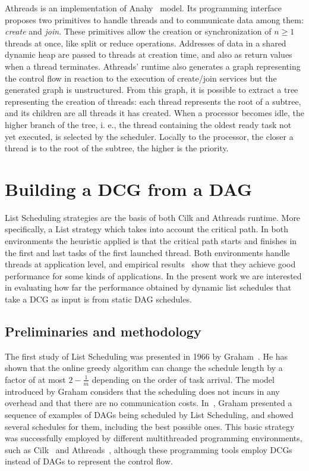 \documentclass[twocolumn]{svjour3}
\begin{document}
Athreads is an implementation of Anahy~\cite{VecParLNCS} model. Its programming interface proposes two primitives to handle threads and to communicate data among them: {\em create} and {\em join}. These primitives allow the creation or synchronization of $n \geq 1$ threads at once, like split or reduce operations. %
Addresses of data in a shared dynamic heap are passed to threads at creation time, and also as return values when a thread terminates. Athreads' runtime also generates a graph representing the control flow in reaction to the execution of create/join services but the generated graph is unstructured.  
From this graph, it is possible to extract a tree representing the creation of threads: each thread represents the root of a subtree, and its children are all threads it has created. When a processor becomes idle, the higher branch of the tree, i. e., the thread containing the oldest ready task not yet executed, is selected by the scheduler. Locally to the processor, the closer a thread is to the root of the subtree, the higher is the priority.

\section{Building a DCG from a DAG}\label{sec:DAG2DCG}

List Scheduling strategies are the basis of both Cilk and {\color{blue}Athreads} runtime. More specifically, a List strategy which takes into account the {\color{blue}critical path}. In both environments the heuristic applied is that the {\color{blue}critical path} starts and finishes in the first and last tasks of the first launched thread. Both environments handle threads at application level, and empirical results~\cite{Cilk95,VecParLNCS} show that they achieve good performance for some kinds of applications. In the present work we are interested in evaluating how far the performance obtained by dynamic list schedules that take a DCG as input is from static DAG schedules.

\subsection{Preliminaries and methodology}

The first study of List Scheduling was presented in 1966 by Graham~\cite{Graham66}. He has shown that the online greedy algorithm can change the schedule length by a factor of at most $2 - \frac{1}{m}$ depending on the order of task arrival. The model introduced by Graham considers that the scheduling does not incurs in any overhead and that there are no communication costs. In~\cite{Graham76}, Graham presented a sequence of examples of DAGs being scheduled by List Scheduling, and showed several schedules for them, including the best possible ones. This basic strategy was successfully employed by different multithreaded programming environments, such as Cilk~\cite{Cilk95} and Athreads~\cite{cordeiro2005}, although these programming tools employ DCGs instead of DAGs to represent the control flow.
\end{document}

